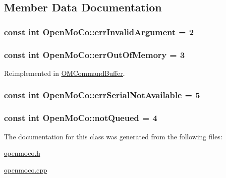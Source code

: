 \subsection{Member Data Documentation}
\hypertarget{class_open_mo_co_aa00b35926b1595d53734089ecb5cf240}{
\subsubsection[{errInvalidArgument}]{\setlength{\rightskip}{0pt plus 5cm}const int {\bf OpenMoCo::errInvalidArgument} = 2}}
\label{class_open_mo_co_aa00b35926b1595d53734089ecb5cf240}
\hypertarget{class_open_mo_co_a0b6b40784caadf923e620295b47d6c39}{
\subsubsection[{errOutOfMemory}]{\setlength{\rightskip}{0pt plus 5cm}const int {\bf OpenMoCo::errOutOfMemory} = 3}}
\label{class_open_mo_co_a0b6b40784caadf923e620295b47d6c39}


Reimplemented in \hyperlink{class_o_m_command_buffer_a529b47966a6c91743ea5e4f1d584b1f2}{OMCommandBuffer}.

\hypertarget{class_open_mo_co_ad444289e4c29d2c419b232e8de1ab5e7}{
\subsubsection[{errSerialNotAvailable}]{\setlength{\rightskip}{0pt plus 5cm}const int {\bf OpenMoCo::errSerialNotAvailable} = 5}}
\label{class_open_mo_co_ad444289e4c29d2c419b232e8de1ab5e7}
\hypertarget{class_open_mo_co_aa4c6578fae22829f8270eea20e002a79}{
\subsubsection[{notQueued}]{\setlength{\rightskip}{0pt plus 5cm}const int {\bf OpenMoCo::notQueued} = 4}}
\label{class_open_mo_co_aa4c6578fae22829f8270eea20e002a79}


The documentation for this class was generated from the following files:\begin{DoxyCompactItemize}
\item 
\hyperlink{openmoco_8h}{openmoco.h}\item 
\hyperlink{openmoco_8cpp}{openmoco.cpp}\end{DoxyCompactItemize}

